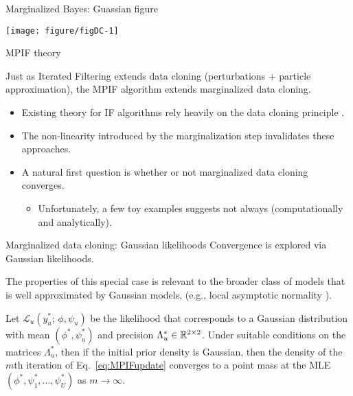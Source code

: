 \documentclass[aspectratio=169]{beamer}\usepackage[]{graphicx}\usepackage[]{xcolor}
\makeatletter
\def\maxwidth{ %
  \ifdim\Gin@nat@width>\linewidth
    \linewidth
  \else
    \Gin@nat@width
  \fi
}
\newenvironment{knitrout}{}{} %
\makeatother
\begin{document}
\begin{frame}{Marginalized Bayes: Guassian figure}

\begin{knitrout}
\color{fgcolor}

{\centering \texttt{[image: figure/figDC-1]} 

}


\end{knitrout}

\end{frame}

\begin{frame}{MPIF theory}

  Just as Iterated Filtering extends data cloning (perturbations + particle approximation), the MPIF algorithm extends marginalized data cloning. 

  \begin{itemize}
    \item Existing theory for IF algorithms rely heavily on the data cloning principle \cite{ionides15, chen24}.
    \item The non-linearity introduced by the marginalization step invalidates these approaches.
    \item A natural first question is whether or not marginalized data cloning converges.
    \begin{itemize}
      \item Unfortunately, a few toy examples suggests not always (computationally and analytically).
    \end{itemize}
  \end{itemize}
  
\end{frame}

\begin{frame}{Marginalized data cloning: Gaussian likelihoods}
  Convergence is explored via Gaussian likelihoods.
  
  The properties of this special case is relevant to the broader class of models that is well approximated by Gaussian models, (e.g., local asymptotic normality \citep{lecam00}).
  
  \begin{theorem}
    Let $\mathcal{L}_u(y_u^*; \, \phi, \psi_u)$ be the likelihood that corresponds to a Gaussian distribution with mean $(\phi^*, \psi_u^*)$ and precision $\Lambda_u^* \in \mathbb{R}^{2\times2}$. Under suitable conditions on the matrices $\Lambda^*_u$, then if the initial prior density is Gaussian, then the density of the $m$th iteration of Eq.~\ref{eq:MPIFupdate} converges to a point mass at the MLE $(\phi^*, \psi_1^*, \ldots, \psi^*_U)$ as $m\rightarrow \infty$.
  \end{theorem}
\end{frame}
\end{document}
